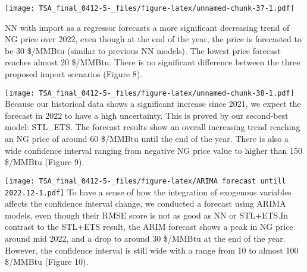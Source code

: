 \documentclass[
]{article}
\begin{document}
\texttt{[image: TSA\_final\_0412-5-\_files/figure-latex/unnamed-chunk-37-1.pdf]}

NN with import as a regressor forecasts a more significant decreasing
trend of NG price over 2022, even though at the end of the year, the
price is forecasted to be 30 \$/MMBtu (similar to previous NN models).
The lowest price forecast reaches almost 20 \$/MMBtu. There is no
significant difference between the three proposed import scenarios
(Figure 8).

\texttt{[image: TSA\_final\_0412-5-\_files/figure-latex/unnamed-chunk-38-1.pdf]}
Because our historical data shows a significant increase since 2021, we
expect the forecast in 2022 to have a high uncertainty. This is proved
by our second-best model: STL\_ETS. The forecast results show an overall
increasing trend reaching an NG price of around 60 \$/MMBtu until the
end of the year. There is also a wide confidence interval ranging from
negative NG price value to higher than 150 \$/MMBtu (Figure 9).

\texttt{[image: TSA\_final\_0412-5-\_files/figure-latex/ARIMA forecast untill 2022.12-1.pdf]}
To have a sense of how the integration of exogenous variables affects
the confidence interval change, we conducted a forecast using ARIMA
models, even though their RMSE score is not as good as NN or STL+ETS.In
contrast to the STL+ETS result, the ARIM forecast shows a peak in NG
price around mid 2022, and a drop to around 30 \$/MMBtu at the end of
the year. However, the confidence interval is still wide with a range
from 10 to almost 100 \$/MMBtu (Figure 10).
\end{document}
